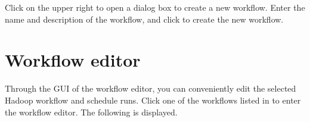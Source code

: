 \documentclass[letterpaper,10pt,english]{sphinxmanual}
\begin{document}
Click  on the upper right to open a dialog box to create a new workflow. Enter the name and description of the workflow, and click  to create the new workflow.
\begin{quote}

\begin{figure}[H]
\centering

\noindent{}
\end{figure}
\end{quote}


\chapter{Workflow editor}
\label{\detokenize{integrator/part03/index:workflow-editor}}\label{\detokenize{integrator/part03/index:id1}}\label{\detokenize{integrator/part03/index::doc}}
Through the GUI of the workflow editor, you can conveniently edit the selected Hadoop workflow and schedule runs. Click one of the workflows listed in {\hyperref[\detokenize{integrator/part02/index:workflow-list}]{}} to enter the workflow editor. The following is displayed.
\end{document}
